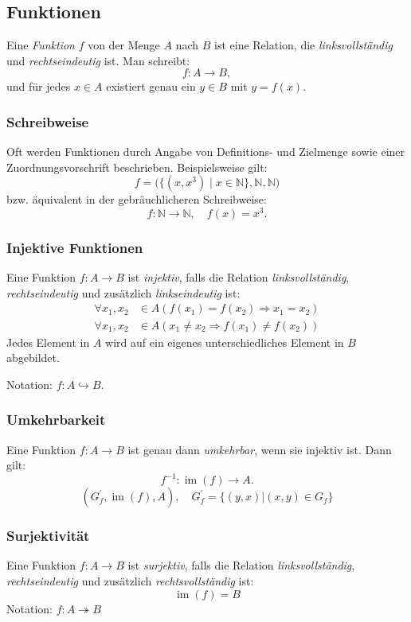 \subsection{Funktionen}
Eine \emph{Funktion} \(f\) von der Menge \(A\) nach \(B\) ist eine Relation, die \emph{linksvollständig} und \emph{rechtseindeutig} ist. Man schreibt:
\[
f: A \to B,
\]
und für jedes \(x\in A\) existiert genau ein \(y\in B\) mit \(y=f(x)\).

\subsubsection{Schreibweise}
Oft werden Funktionen durch Angabe von Definitions- und Zielmenge sowie einer
Zuordnungsvorschrift beschrieben. Beispielsweise gilt:
\[
f = \bigl(\{(x, x^3) \mid x \in \mathbb{N}\}, \mathbb{N}, \mathbb{N}\bigr)
\]
bzw. äquivalent in der gebräuchlicheren Schreibweise:
\[
f : \mathbb{N} \to \mathbb{N}, \quad f(x) = x^3.
\]

\subsubsection{Injektive Funktionen}
Eine Funktion $f : A \to B$ ist \emph{injektiv}, falls die Relation \emph{linksvollständig}, \emph{rechtseindeutig} und zusätzlich \emph{linkseindeutig} ist:
\begin{align*}
  \forall x_1, x_2 &\in A (f(x_1) = f(x_2) \Rightarrow x_1 = x_2)\\
  \forall x_1, x_2 &\in A (x_1 \neq x_2 \Rightarrow f(x_1) \neq f(x_2))
\end{align*}
Jedes Element in \(A\) wird auf ein eigenes unterschiedliches Element in \(B\) abgebildet.

Notation: $f : A \hookrightarrow B$.

\subsubsection{Umkehrbarkeit}
Eine Funktion $f : A \to B$ ist genau dann \emph{umkehrbar}, wenn sie injektiv ist. Dann gilt:
\[
f^{-1} : \operatorname{im}(f) \to A.
\]
\[
(G^\prime_f, \operatorname{im}(f), A), \quad G^\prime_f = \{(y,x) | (x,y) \in G_f\}
\]

\subsubsection{Surjektivität}
Eine Funktion $f : A \to B$ ist \emph{surjektiv}, falls die Relation \emph{linksvollständig}, \emph{rechtseindeutig} und zusätzlich \emph{rechtsvollständig} ist:
\[
\operatorname{im}(f) = B
\]
Notation: \(f:A \twoheadrightarrow B\)

